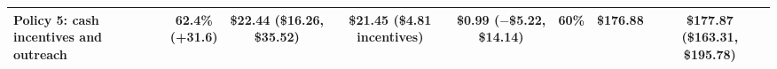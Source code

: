 \begin{tabular}{>{\raggedright\arraybackslash}p{2.7cm}ccccccc}
Policy 5: cash incentives and outreach & \makecell{62.4\% \\ {\footnotesize (+31.6)}} & \makecell{\$22.44 \\ {\footnotesize (\$16.26, \$35.52)}} & \makecell{\$21.45 \\ {\footnotesize (\$4.81 incentives)}} & \makecell{\$0.99 \\ {\footnotesize ($-$\$5.22, \$14.14)}} & 60\% & \$176.88 & \makecell{\$177.87 \\ {\footnotesize (\$163.31, \$195.78)}} \\
\bottomrule
\end{tabular}
